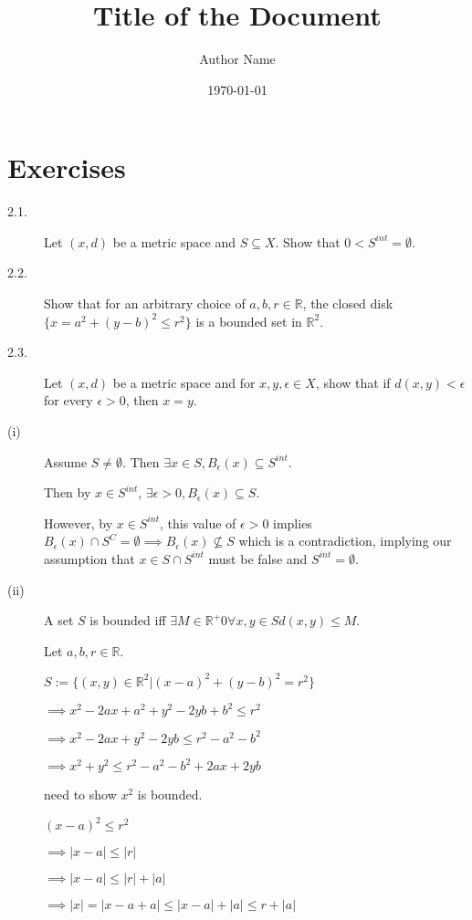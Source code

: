 \documentclass{article}
\title{\textbf{Title of the Document}}
\author{Author Name}
\date{\today}
\theoremstyle{definition}
\numberwithin{equation}{section}
\begin{document}
\maketitle
\tableofcontents
\newpage
\section{Exercises}
\begin{description}
    \item[2.1.] Let \((x,d)\) be a metric space and \(S \subseteq X\). Show that \(0<S^{int} = \emptyset\).
    \item[2.2.] Show that for an arbitrary choice of \(a, b, r \in \mathbb{R}\), the closed disk \(\{x = a^2 + (y - b)^2 \le r^2\}\) is a bounded set in \(\mathbb{R}^2\).
    \item[2.3.] Let \((x, d)\) be a metric space and for \(x, y, \epsilon \in X\), show that if \(d(x, y) < \epsilon\) for every \(\epsilon > 0\), then \(x = y\).

    \item[(i)] Assume \(S \neq \emptyset\). Then \(\exists x \in S, B_\epsilon (x) \subseteq S^{int}\).

    Then by \(x \in S^{int}\), \(\exists \epsilon > 0, B_\epsilon (x) \subseteq S\).

    However, by \(x \in S^{int}\), this value of \(\epsilon > 0\) implies 
    $ B_\epsilon (x) \cap S^C = \emptyset \implies B_\epsilon (x) \nsubseteq S $
    which is a contradiction, 
    implying our assumption that \( x \in S \cap S^{int} \) must be false and \( S^{int} = \emptyset \).

    \item[(ii)] A set \(S\) is bounded iff $\exists M \in \mathbb{R}^+ 0 \forall x,y \in S d(x,y) \le M$.

    Let \(a, b, r \in \mathbb{R}\).

    \(S := \{ (x,y) \in \mathbb{R}^2 | (x - a)^2 + (y - b)^2 = r^2 \} \)

    $ \implies x^2 - 2ax + a^2 + y^2 - 2yb + b^2 \le r^2 $

    $ \implies x^2 - 2ax + y^2 - 2yb \le r^2 - a^2 - b^2 $

    $ \implies x^2 + y^2 \le r^2 - a^2 - b^2 + 2ax + 2yb $

    need to show \( x^2 \) is bounded.

    $
    (x - a)^2 \le r^2
    $

    $
    \implies |x - a| \le | r |
    $

    $
    \implies |x - a| \le |r| + |a|
    $

    $
    \implies | x | = | x - a + a | \le | x - a | + |a| \le r + |a|
    $
\end{description}
\end{document}
